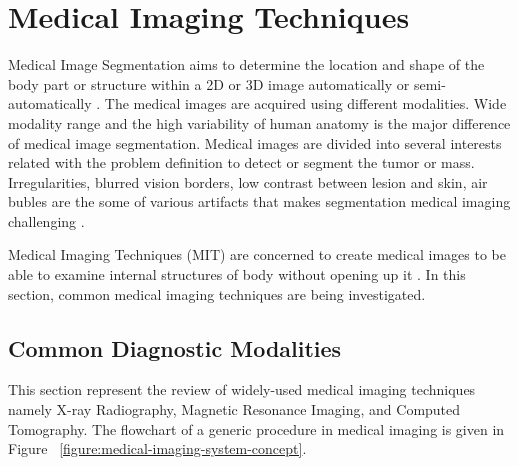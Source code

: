 \section{Medical Imaging Techniques}

    Medical Image Segmentation aims to determine the location and shape of the body part or structure within a 2D or 3D image automatically or semi-automatically \cite{merjulah2019classification}.
    The medical images are acquired using different modalities.
    Wide modality range and the high variability of human anatomy is the major difference of medical image segmentation.
    Medical images are divided into several interests related with the problem definition to detect or segment the tumor or mass.
    Irregularities, blurred vision borders, low contrast between lesion and skin, air bubles are the some of various artifacts that makes segmentation medical imaging challenging \cite{guo2019neutrosophic}.

    Medical Imaging Techniques (MIT) are concerned to create medical images to be able to examine internal structures of body without opening up it \cite{kasban2015comparative}.
    In this section, common medical imaging techniques are being investigated.

    \subsection{Common Diagnostic Modalities}

        

        This section represent the review of widely-used medical imaging techniques namely X-ray Radiography,
        Magnetic Resonance Imaging, and Computed Tomography. The flowchart of a generic procedure in medical imaging
        is given in Figure ~\ref{figure:medical-imaging-system-concept}.

